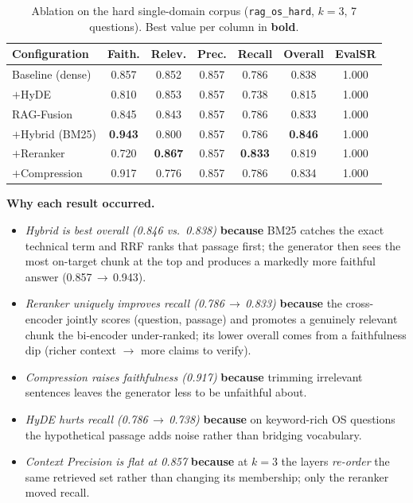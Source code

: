\documentclass[12pt,a4paper]{report}
\begin{document}
\begin{table}[h]
\centering
\caption{Ablation on the hard single-domain corpus (\texttt{rag\_os\_hard},
$k=3$, 7 questions). Best value per column in \textbf{bold}.}
\label{tab:results}
\small
\begin{tabular}{@{}lcccccc@{}}
\toprule
\textbf{Configuration} & \textbf{Faith.} & \textbf{Relev.} & \textbf{Prec.} &
\textbf{Recall} & \textbf{Overall} & \textbf{EvalSR}\\
\midrule
Baseline (dense)     & 0.857 & 0.852 & 0.857 & 0.786 & 0.838 & 1.000\\
$+$HyDE              & 0.810 & 0.853 & 0.857 & 0.738 & 0.815 & 1.000\\
RAG-Fusion           & 0.845 & 0.843 & 0.857 & 0.786 & 0.833 & 1.000\\
$+$Hybrid (BM25)     & \textbf{0.943} & 0.800 & 0.857 & 0.786 & \textbf{0.846} & 1.000\\
$+$Reranker          & 0.720 & \textbf{0.867} & 0.857 & \textbf{0.833} & 0.819 & 1.000\\
$+$Compression       & 0.917 & 0.776 & 0.857 & 0.786 & 0.834 & 1.000\\
\bottomrule
\end{tabular}
\end{table}

\noindent\textbf{Why each result occurred.}
\begin{itemize}[nosep]
  \item \emph{Hybrid is best overall (0.846 vs.\ 0.838)} \textbf{because} BM25
        catches the exact technical term and RRF ranks that passage first; the
        generator then sees the most on-target chunk at the top and produces a
        markedly more faithful answer (0.857\,$\rightarrow$\,0.943).
  \item \emph{Reranker uniquely improves recall (0.786\,$\rightarrow$\,0.833)}
        \textbf{because} the cross-encoder jointly scores (question, passage) and
        promotes a genuinely relevant chunk the bi-encoder under-ranked; its lower
        overall comes from a faithfulness dip (richer context $\rightarrow$ more
        claims to verify).
  \item \emph{Compression raises faithfulness (0.917)} \textbf{because} trimming
        irrelevant sentences leaves the generator less to be unfaithful about.
  \item \emph{HyDE hurts recall (0.786\,$\rightarrow$\,0.738)} \textbf{because} on
        keyword-rich OS questions the hypothetical passage adds noise rather than
        bridging vocabulary.
  \item \emph{Context Precision is flat at 0.857} \textbf{because} at $k=3$ the
        layers \emph{re-order} the same retrieved set rather than changing its
        membership; only the reranker moved recall.
\end{itemize}
\end{document}
